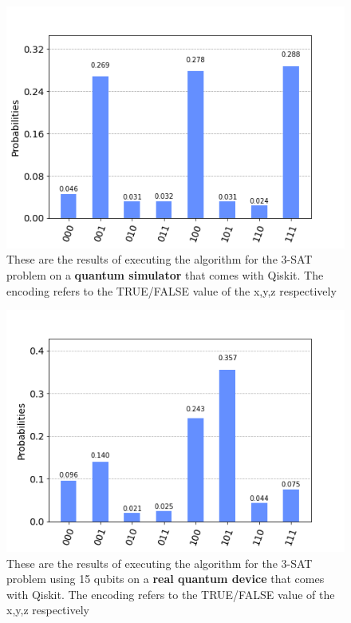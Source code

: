 \begin{figure}[h]
	\centering
	\includegraphics[scale = 0.75]{../Demonstration/img/simulated_3SAT.PNG}
	\caption{These are the results of executing the algorithm for the 3-SAT problem on a \textbf{quantum simulator} that comes with Qiskit. The encoding refers to the TRUE/FALSE value of the x,y,z respectively}
\end{figure}


\begin{figure}[h]
	\centering
	\includegraphics[scale = 0.75]{../Demonstration/img/real_device_3SAT.PNG}
	\caption{These are the results of executing the algorithm for the 3-SAT problem using 15 qubits on a \textbf{real quantum device} that comes with Qiskit. The encoding refers to the TRUE/FALSE value of the x,y,z respectively}
\end{figure}

